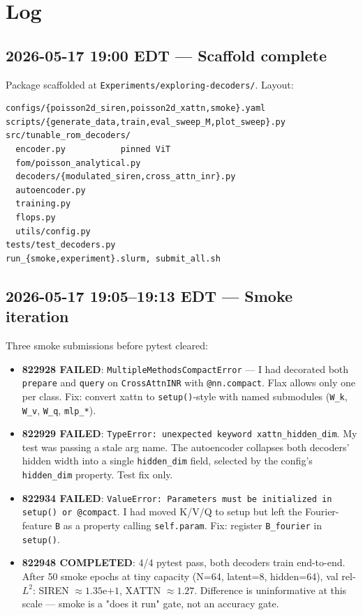 \documentclass[11pt]{article}
\begin{document}
\section{Log}

\subsection*{2026-05-17 19:00 EDT --- Scaffold complete}
Package scaffolded at \texttt{Experiments/exploring-decoders/}. Layout:
\begin{lstlisting}
configs/{poisson2d_siren,poisson2d_xattn,smoke}.yaml
scripts/{generate_data,train,eval_sweep_M,plot_sweep}.py
src/tunable_rom_decoders/
  encoder.py           pinned ViT
  fom/poisson_analytical.py
  decoders/{modulated_siren,cross_attn_inr}.py
  autoencoder.py
  training.py
  flops.py
  utils/config.py
tests/test_decoders.py
run_{smoke,experiment}.slurm, submit_all.sh
\end{lstlisting}

\subsection*{2026-05-17 19:05--19:13 EDT --- Smoke iteration}
Three smoke submissions before pytest cleared:
\begin{itemize}
\item \textbf{822928 FAILED}: \texttt{MultipleMethodsCompactError} --- I had
      decorated both \texttt{prepare} and \texttt{query} on
      \texttt{CrossAttnINR} with \texttt{@nn.compact}. Flax allows only one
      per class. Fix: convert xattn to \texttt{setup()}-style with named
      submodules (\texttt{W\_k}, \texttt{W\_v}, \texttt{W\_q},
      \texttt{mlp\_*}).
\item \textbf{822929 FAILED}: \texttt{TypeError: unexpected keyword
      \texttt{xattn\_hidden\_dim}}. My test was passing a stale arg name.
      The autoencoder collapses both decoders' hidden width into a single
      \texttt{hidden\_dim} field, selected by the config's
      \texttt{hidden\_dim} property. Test fix only.
\item \textbf{822934 FAILED}: \texttt{ValueError: Parameters must be
      initialized in setup() or @compact}. I had moved K/V/Q to setup but
      left the Fourier-feature \texttt{B} as a property calling
      \texttt{self.param}. Fix: register \texttt{B\_fourier} in
      \texttt{setup()}.
\item \textbf{822948 COMPLETED}: 4/4 pytest pass, both decoders train
      end-to-end. After 50 smoke epochs at tiny capacity (N=64, latent=8,
      hidden=64), val rel-$L^2$: SIREN $\approx 1.35\mathrm{e}{+1}$, XATTN
      $\approx 1.27$. Difference is uninformative at this scale --- smoke
      is a "does it run" gate, not an accuracy gate.
\end{itemize}
\end{document}
